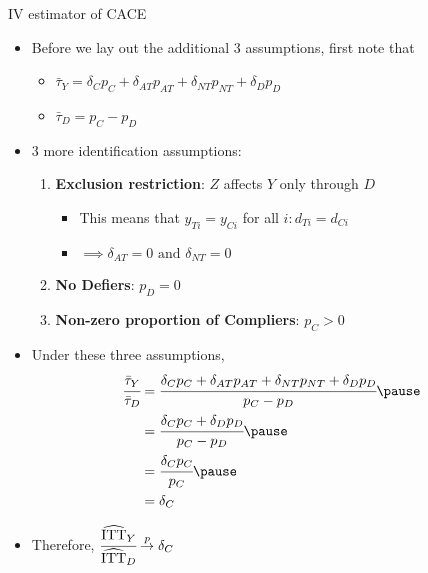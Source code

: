 \documentclass[table, xcolor={dvipsnames}, 9pt]{beamer}
\theoremstyle{newstyle}
\begin{document}
\begin{frame}{IV estimator of CACE}
\begin{itemize}
\item Before we lay out the additional $3$ assumptions, first note that
\begin{itemize}
\item \pause $\bar{\tau}_Y = \delta_C p_C + \delta_{AT} p_{AT} + \delta_{NT} p_{NT} + \delta_D p_D$
\item \pause $\bar{\tau}_D = p_C - p_D$
\end{itemize}	
\item \pause $3$ more identification assumptions:
\begin{enumerate}
\item \pause \textbf{Exclusion restriction}: $Z$ affects $Y$ only through $D$
\begin{itemize}
\item \pause This means that $y_{Ti} = y_{Ci}$ for all $i: d_{Ti} = d_{Ci}$
\item \pause $\implies \delta_{AT} = 0 \text{ and }\delta_{NT} = 0$
\end{itemize}
\item \pause \textbf{No Defiers}: $p_D = 0$
\item \pause \textbf{Non-zero proportion of Compliers}: $p_C > 0$
\end{enumerate}	
\item \pause Under these three assumptions,
\begin{align*}
\cfrac{\bar{\tau}_Y}{\bar{\tau}_D} & = \cfrac{\delta_C p_C + \delta_{AT} p_{AT} + \delta_{NT} p_{NT} + \delta_D p_D}{p_C - p_D} \pause \\
& = \cfrac{\delta_C p_C + \delta_D p_D}{p_C - p_D} \pause \\
& = \cfrac{\delta_C p_C}{p_C} \pause \\
& = \delta_C
\end{align*} 
\item \pause Therefore, $\cfrac{\widehat{\text{ITT}}_Y}{\widehat{\text{ITT}}_D} \overset{p}{\to} \delta_C$
\end{itemize}
\end{frame}
\end{document}
